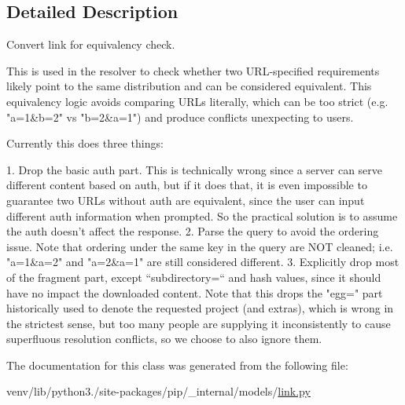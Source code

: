 \subsection{Detailed Description}
\begin{DoxyVerb}Convert link for equivalency check.

This is used in the resolver to check whether two URL-specified requirements
likely point to the same distribution and can be considered equivalent. This
equivalency logic avoids comparing URLs literally, which can be too strict
(e.g. "a=1&b=2" vs "b=2&a=1") and produce conflicts unexpecting to users.

Currently this does three things:

1. Drop the basic auth part. This is technically wrong since a server can
   serve different content based on auth, but if it does that, it is even
   impossible to guarantee two URLs without auth are equivalent, since
   the user can input different auth information when prompted. So the
   practical solution is to assume the auth doesn't affect the response.
2. Parse the query to avoid the ordering issue. Note that ordering under the
   same key in the query are NOT cleaned; i.e. "a=1&a=2" and "a=2&a=1" are
   still considered different.
3. Explicitly drop most of the fragment part, except ``subdirectory=`` and
   hash values, since it should have no impact the downloaded content. Note
   that this drops the "egg=" part historically used to denote the requested
   project (and extras), which is wrong in the strictest sense, but too many
   people are supplying it inconsistently to cause superfluous resolution
   conflicts, so we choose to also ignore them.
\end{DoxyVerb}
 

The documentation for this class was generated from the following file\+:\begin{DoxyCompactItemize}
\item 
venv/lib/python3./site-\/packages/pip/\+\_\+internal/models/\hyperlink{link_8py}{link.\+py}\end{DoxyCompactItemize}
